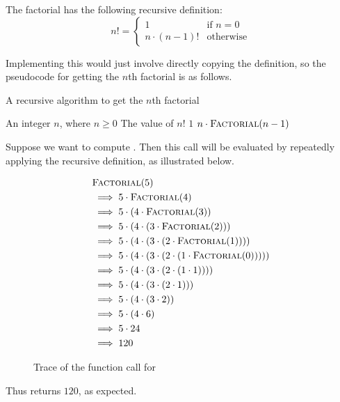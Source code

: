 \begin{example}
The factorial has the following recursive definition:
\[
n! = \begin{cases}
1 & \text{if } n=0 \\
n\cdot\left(n-1\right)! & \text{otherwise}
\end{cases}
\]

Implementing this would just involve directly copying the definition, so the pseudocode for getting the $n$th factorial is as follows.

\begin{algorithm}[H]
    \caption{A recursive algorithm to get the $n$th factorial}
    \begin{algorithmic}[1]
    \Require An integer $n$, where $n \ge 0$
    \Ensure The value of $n!$
        \Return $1$
        \Else
        \Return $n \cdot \text{\Call{Factorial}{$n-1$}}$
        \EndIf
    \EndFunction
\end{algorithmic}
\end{algorithm}

Suppose we want to compute . Then this call will be evaluated by repeatedly applying the recursive definition, as illustrated below. 
\begin{figure}[H]
    \centering
    \begin{align*}
    & \Call{Factorial}{5} \\
    &\implies 5 \cdot \Call{Factorial}{4} \\
    &\implies 5 \cdot \left( 4 \cdot \Call{Factorial}{3} \right) \\
    &\implies 5 \cdot \left( 4 \cdot \left( 3 \cdot \Call{Factorial}{2} \right) \right) \\
    &\implies 5 \cdot \left( 4 \cdot \left( 3 \cdot \left( 2 \cdot \Call{Factorial}{1} \right) \right) \right) \\
    &\implies 5 \cdot \left( 4 \cdot \left( 3 \cdot \left( 2 \cdot \left( 1 \cdot \Call{Factorial}{0} \right) \right) \right) \right) \\
    &\implies 5 \cdot \left( 4 \cdot \left( 3 \cdot \left( 2 \cdot \left( 1 \cdot 1 \right) \right) \right) \right) \\
    &\implies 5 \cdot \left( 4 \cdot \left( 3 \cdot \left( 2 \cdot 1 \right) \right) \right) \\
    &\implies 5 \cdot \left( 4 \cdot \left( 3 \cdot 2 \right) \right) \\
    &\implies 5 \cdot \left( 4 \cdot 6 \right) \\
    &\implies 5 \cdot 24 \\
    &\implies 120
    \end{align*}
    \caption{Trace of the function call for }
\end{figure}

Thus  returns $120$, as expected.
\end{example}


